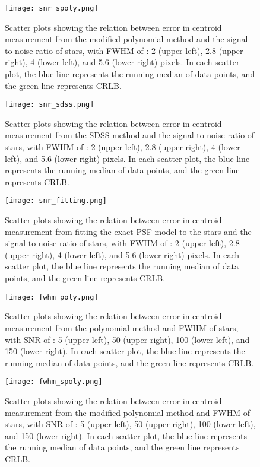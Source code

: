 \documentclass[12pt, preprint]{aastex}
\begin{document}
\begin{figure}[!htb]
  \texttt{[image: snr\_spoly.png]}
\endminipage
\caption{Scatter plots showing the relation between error in centroid measurement from the modified polynomial method and the signal-to-noise ratio of stars, with FWHM of : 2 (upper left), 2.8 (upper right), 4 (lower left), and 5.6 (lower right) pixels. In each scatter plot, the blue line represents the running median of data points, and the green line represents CRLB.}\label{2}
\end{figure}

\begin{figure}[!htb]
  \texttt{[image: snr\_sdss.png]}
\endminipage
\caption{Scatter plots showing the relation between error in centroid measurement from the SDSS method and the signal-to-noise ratio of stars, with FWHM of : 2 (upper left), 2.8 (upper right), 4 (lower left), and 5.6 (lower right) pixels. In each scatter plot, the blue line represents the running median of data points, and the green line represents CRLB.}\label{3}
\end{figure}

\begin{figure}[!htb]
  \texttt{[image: snr\_fitting.png]}
\endminipage
\caption{Scatter plots showing the relation between error in centroid measurement from fitting the exact PSF model to the stars and the signal-to-noise ratio of stars, with FWHM of : 2 (upper left), 2.8 (upper right), 4 (lower left), and 5.6 (lower right) pixels. In each scatter plot, the blue line represents the running median of data points, and the green line represents CRLB.}\label{4}
\end{figure}

\begin{figure}[!htb]
  \texttt{[image: fwhm\_poly.png]}
\endminipage
\caption{Scatter plots showing the relation between error in centroid measurement from the polynomial method and FWHM of stars, with SNR  of : 5 (upper left), 50 (upper right), 100 (lower left), and 150 (lower right). In each scatter plot, the blue line represents the running median of data points, and the green line represents CRLB.}\label{5}
\end{figure}

\begin{figure}[!htb]
  \texttt{[image: fwhm\_spoly.png]}
\endminipage
\caption{Scatter plots showing the relation between error in centroid measurement from the modified polynomial method and FWHM of stars, with SNR  of : 5 (upper left), 50 (upper right), 100 (lower left), and 150 (lower right). In each scatter plot, the blue line represents the running median of data points, and the green line represents CRLB.}\label{6}
\end{figure}
\end{document}
